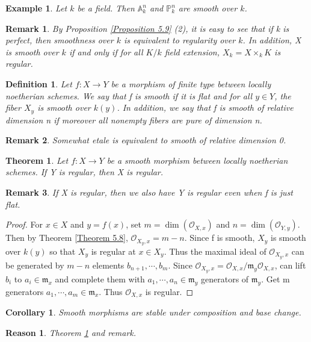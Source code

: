 \documentclass{ctexart}
\newtheorem{definition}{Definition}[section]
\newtheorem{remark}{Remark}[section]
\newtheorem{theorem}{Theorem}[section]
\newtheorem{reason}{Reason}[section]
\newtheorem{example}{Example}[section]
\newtheorem{corollary}{Corollary}[section]
\begin{document}
\begin{example}
    Let $k$ be a field.
    Then $\mathbb{A}_{k}^{n}$ and $\mathbb{P}_{k}^{n}$ are smooth over $k$.
\end{example}
\begin{remark}
    By Proposition \ref{Proposition 5.9} (2), it is easy to see that if k is perfect, then smoothness over $k$ is equivalent to regularity over $k$.
    In addition, X is smooth over $k$ if and only if for all $K/k$ field extension, $X_{k} = X \times_{k} K$ is regular.
\end{remark}
\begin{definition}
    Let $f: X \longrightarrow Y$ be a morphism of finite type between locally noetherian schemes.
    We say that f is smooth if it is flat and for all $y\in Y$, the fiber $X_{y}$ is smooth over $k(y)$.
    In addition, we say that f is smooth of relative dimension n if moreover all nonempty fibers are pure of dimension n.
\end{definition}
\begin{remark}
    Somewhat etale is equivalent to smooth of relative dimension 0.
\end{remark}
\begin{theorem}
    Let $f: X \longrightarrow Y$ be a smooth morphism between locally noetherian schemes.
    If Y is regular, then X is regular.
    \label{Theorem 5.10}
\end{theorem}
\begin{remark}
    If X is regular, then we also have Y is regular even when f is just flat.
\end{remark}
\begin{proof}
    For $x\in X$ and $y = f(x)$, set $m = \dim(\mathcal{O}_{X, x})$ and $n = \dim(\mathcal{O}_{Y, y})$.
    Then by Theorem \ref{Theorem 5.8}, $\mathcal{O}_{X_{y}, x} = m - n$.
    Since f is smooth, $X_{y}$ is smooth over $k(y)$ so that $X_{y}$ is regular at $x\in X_{y}$.
    Thus the maximal ideal of $\mathcal{O}_{X_{y}, x}$ can be generated by $m - n$ elements $b_{n + 1}, \cdots, b_{m}$.
    Since $\mathcal{O}_{X_{y}, x} = \mathcal{O}_{X, x}/\mathfrak{m}_{y}\mathcal{O}_{X, x}$, can lift $b_{i}$ to $a_{i}\in \mathfrak{m}_{x}$ and complete them with $a_{1}, \cdots, a_{n}\in \mathfrak{m}_{y}$ generators of $\mathfrak{m}_{y}$.
    Get m generators $a_{1}, \cdots, a_{m}\in \mathfrak{m}_{x}$.
    Thus $\mathcal{O}_{X, x}$ is regular. 
\end{proof}
\begin{corollary}
    Smooth morphisms are stable under composition and base change.
    \label{Corollary 5.5}
\end{corollary}
\begin{reason}
    Theorem \ref{Theorem 5.10} and remark.
\end{reason}
\end{document}
